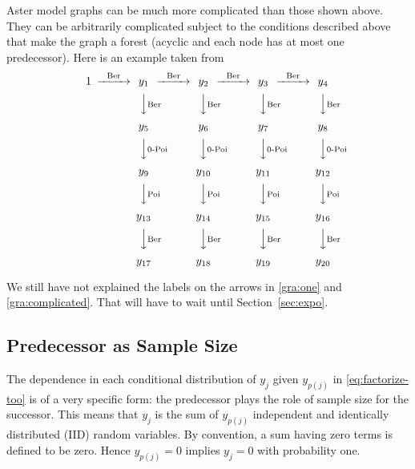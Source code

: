 \documentclass[11pt]{article}
\begin{document}

Aster model graphs can be much more complicated than those shown above.
They can be arbitrarily complicated subject to the conditions described
above that make the graph a forest (acyclic and each node has at most one
predecessor).  Here is an example taken from \citet{aster3}
\begin{equation} \label{gra:complicated}
\begin{CD}
   1
   @>\text{Ber}>>
   y_1
   @>\text{Ber}>>
   y_2
   @>\text{Ber}>>
   y_3
   @>\text{Ber}>>
   y_4
   \\
   @.
   @VV\text{Ber}V
   @VV\text{Ber}V
   @VV\text{Ber}V
   @VV\text{Ber}V
   \\
   \hphantom{1}
   @.
   y_5
   @.
   y_6
   @.
   y_7
   @.
   y_8
   \\
   @.
   @VV\text{0-Poi}V
   @VV\text{0-Poi}V
   @VV\text{0-Poi}V
   @VV\text{0-Poi}V
   \\
   \hphantom{1}
   @.
   y_9
   @.
   y_{10}
   @.
   y_{11}
   @.
   y_{12}
   \\
   @.
   @VV\text{Poi}V
   @VV\text{Poi}V
   @VV\text{Poi}V
   @VV\text{Poi}V
   \\
   \hphantom{1}
   @.
   y_{13}
   @.
   y_{14}
   @.
   y_{15}
   @.
   y_{16}
   \\
   @.
   @VV\text{Ber}V
   @VV\text{Ber}V
   @VV\text{Ber}V
   @VV\text{Ber}V
   \\
   \hphantom{1}
   @.
   y_{17}
   @.
   y_{18}
   @.
   y_{19}
   @.
   y_{20}
\end{CD}
\end{equation}

We still have not explained the labels on the arrows in \eqref{gra:one}
and \eqref{gra:complicated}.
That will have to wait until Section~\ref{sec:expo}.

\subsection{Predecessor as Sample Size} \label{sec:sample-size}

The dependence in each conditional distribution of $y_j$ given
$y_{p(j)}$ in \eqref{eq:factorize-too} is of a very specific form:
the predecessor plays the role of
sample size for the successor.  This means that $y_j$ is the sum of $y_{p(j)}$
independent and identically distributed (IID) random variables.
By convention, a sum having zero terms is defined to be zero.
Hence $y_{p(j)} = 0$ implies $y_j = 0$ with probability one.
\end{document}
